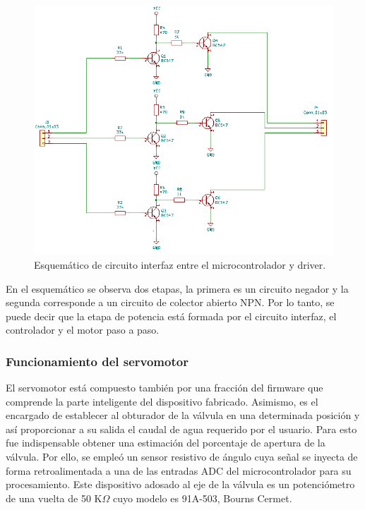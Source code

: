 \begin{figure} [htpb]
\centering
\includegraphics[scale=.85]{./Figures/esquematico-circuito-interfaz.png}
\caption{Esquemático de circuito interfaz entre el microcontrolador y driver.}
\label{fig:esquemático circuito interfaz}
\end{figure}

En el esquemático se observa dos etapas, la primera es un circuito negador y la segunda corresponde a un circuito de colector abierto NPN.
Por lo tanto, se puede decir que la etapa de potencia está formada por el circuito interfaz, el controlador y el motor paso a paso. 
\vspace{2cm}
\subsubsection{Funcionamiento del servomotor}
 
El servomotor está compuesto también por una fracción del firmware que comprende la parte inteligente del dispositivo fabricado.
Asimismo, es el encargado de establecer al obturador de la válvula en una determinada posición y así proporcionar a su salida el caudal de agua requerido por el usuario. 
Para esto fue indispensable obtener una estimación del porcentaje de apertura de la válvula. Por ello, se empleó un sensor resistivo de ángulo cuya señal se inyecta de forma retroalimentada a una de las entradas ADC del microcontrolador para su procesamiento. Este dispositivo adosado al eje de la válvula es un potenciómetro de una vuelta de 50 K$\Omega$ cuyo modelo es 91A-503, Bourns Cermet.

